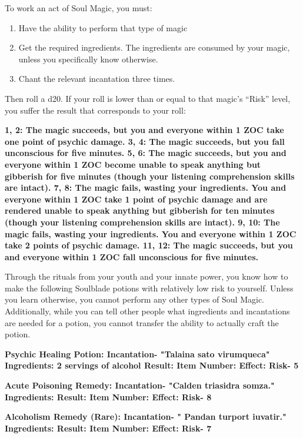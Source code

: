 \documentclass[green]{Kos}
\begin{document}
\name{\gButlerSoulMagic{}}


To work an act of Soul Magic, you must:

\begin{enumerate} 
\item Have the ability to perform that type of magic
\item Get the required ingredients. The ingredients are consumed by your magic, unless you specifically know otherwise.
\item Chant the relevant incantation three times.
\end{enumerate}

Then roll a d20. If your roll is lower than or equal to that magic's “Risk” level, you suffer the result that corresponds to your roll:

\bf{1, 2:} The magic succeeds, but you and everyone within 1 ZOC take one point of psychic damage.
\bf{3, 4:} The magic succeeds, but you fall unconscious for five minutes.
\bf{5, 6:} The magic succeeds, but you and everyone within 1 ZOC become unable to speak anything but gibberish for five minutes (though your listening comprehension skills are intact).
\bf{7, 8:} The magic fails, wasting your ingredients.  You and everyone within 1 ZOC take 1 point of psychic damage and are rendered unable to speak anything but gibberish for ten minutes (though your listening comprehension skills are intact).
\bf{9, 10:} The magic fails, wasting your ingredients. You and everyone within 1 ZOC take 2 points of psychic damage.
\bf{11, 12:} The magic succeeds, but you and everyone within 1 ZOC fall unconscious for five minutes.

Through the rituals from your youth and your innate power, you know how to make the following Soulblade potions with relatively low risk to yourself. Unless you learn otherwise, you cannot perform any other types of Soul Magic. Additionally, while you can tell other people what ingredients and incantations are needed for a potion, you cannot transfer the ability to actually craft the potion.

\bf{Psychic Healing Potion:}
Incantation- "Talaina sato virumqueca"
Ingredients: 2 servings of alcohol
Result: \iPsychicHealthRemedy{\MYname}
Item Number: \iPsychicHealthRemedy{\MYnumber}
Effect: \iPsychicHealthRemedy{\MYtext}
Risk- 5

\bf{Acute Poisoning Remedy:}
Incantation- "Calden triasidra somza."
Ingredients: \iHerbs{\MYname}
Result: \iAcutePoisonRemedy{\MYname}
Item Number: \iAcutePoisonRemedy{\MYnumber}
Effect: \iAcutePoisonRemedy{\MYtext}
Risk- 8

\bf{Alcoholism Remedy (Rare):}
Incantation- " Pandan turport iuvatir."
Ingredients: \iSugar{\MYname}
Result: \iAlcoholismRemedy{\MYname}
Item Number: \iAlcoholismRemedy{\MYnumber}
Effect: \iAlcoholismRemedy{\MYtext}
Risk- 7
\end{document}
